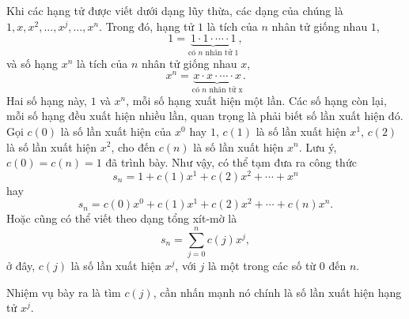 \documentclass[12pt]{article} %
\begin{document}
Khi các hạng tử được viết dưới dạng lũy thừa, các dạng của chúng là \(1, x, x^2, \dots, x^j, \dots, x^n\). Trong đó, hạng tử \(1\) là tích của \(n\) nhân tử giống nhau \(1\), 
    \[1=\underbrace{1 \cdot 1 \cdot \cdots \cdot 1}_{\text{có \(n\) nhân tử 1}},\]
và số hạng \(x^n\) là tích của \(n\) nhân tử giống nhau \(x\),
    \[x^n=\underbrace{x \cdot x \cdot \cdots \cdot x}_{\text{có \(n\) nhân tử x}}.\]
Hai số hạng này, \(1\) và \(x^n\), mỗi số hạng xuất hiện một lần. Các số hạng còn lại, mỗi số hạng đều xuất hiện nhiều lần, quan trọng là phải biết số lần xuất hiện đó. Gọi \(c(0)\) là số lần xuất hiện của \(x^0\) hay \(1\), \(c(1)\) là số lần xuất hiện \(x^1\), \(c(2)\) là số lần xuất hiện \(x^2\), cho đến \(c(n)\) là số lần xuất hiện \(x^n\). Lưu ý, \(c(0)=c(n)=1\) đã trình bày. Như vậy, có thể tạm đưa ra công thức
    \[s_n=1+c(1)x^1+c(2)x^2+\cdots+x^n\]
hay
    \[s_n=c(0)x^0+c(1)x^1+c(2)x^2+\cdots+c(n)x^n.\]
Hoặc cũng có thể viết theo dạng tổng xít-mờ là
    \[s_n=\sum_{j=0}^nc(j)x^j,\]
ở đây, \(c(j)\) là số lần xuất hiện \(x^j\), với \(j\) là một trong các số từ \(0\) đến \(n\). 

Nhiệm vụ bày ra là tìm \(c(j)\), cần nhấn mạnh nó chính là số lần xuất hiện hạng tử \(x^j\).
\end{document}
